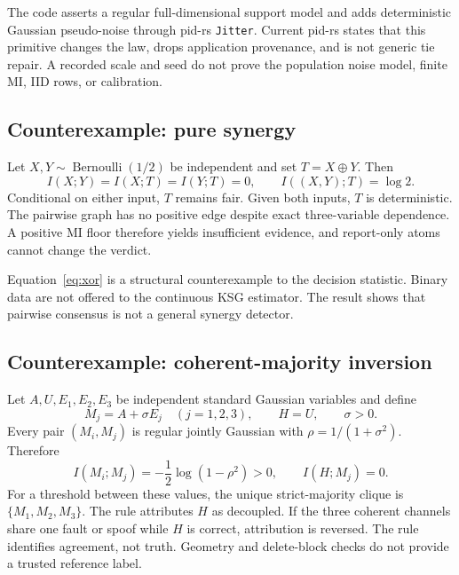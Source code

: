 \documentclass[11pt]{article}
\begin{document}
The code asserts a regular full-dimensional support model and adds deterministic
Gaussian pseudo-noise through pid-rs \texttt{Jitter}.  Current pid-rs states that
this primitive changes the law, drops application provenance, and is not generic
tie repair.  A recorded scale and seed do not prove the population noise model,
finite MI, IID rows, or calibration.

\subsection{Counterexample: pure synergy}

Let $X,Y\sim\operatorname{Bernoulli}(1/2)$ be independent and set
$T=X\oplus Y$.  Then
\begin{equation}\label{eq:xor}
 I(X;Y)=I(X;T)=I(Y;T)=0,
 \qquad I((X,Y);T)=\log 2.
\end{equation}
Conditional on either input, $T$ remains fair.  Given both inputs, $T$ is
deterministic.  The pairwise graph has no positive edge despite exact
three-variable dependence.  A positive MI floor therefore yields insufficient
evidence, and report-only atoms cannot change the verdict.

Equation~\eqref{eq:xor} is a structural counterexample to the decision
statistic.  Binary data are not offered to the continuous KSG estimator.  The
result shows that pairwise consensus is not a general synergy detector.

\subsection{Counterexample: coherent-majority inversion}

Let $A,U,E_1,E_2,E_3$ be independent standard Gaussian variables and define
\begin{equation}\label{eq:majority}
 M_j=A+\sigma E_j\quad (j=1,2,3),
 \qquad H=U,
 \qquad \sigma>0.
\end{equation}
Every pair $(M_i,M_j)$ is regular jointly Gaussian with
$\rho=1/(1+\sigma^2)$.  Therefore
\begin{equation}
 I(M_i;M_j)=-\frac12\log(1-\rho^2)>0,
 \qquad I(H;M_j)=0.
\end{equation}
For a threshold between these values, the unique strict-majority clique is
$\{M_1,M_2,M_3\}$.  The rule attributes $H$ as decoupled.  If the three coherent
channels share one fault or spoof while $H$ is correct, attribution is reversed.
The rule identifies agreement, not truth.  Geometry and delete-block checks do
not provide a trusted reference label.
\end{document}
